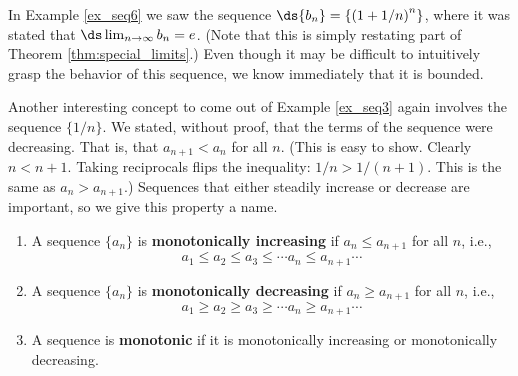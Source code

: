 
In Example \ref{ex_seq6} we saw the sequence $\ds \{b_n\} = \left\{\left(1+1/n\right)^{n}\right\}$, where it was stated that $\ds \lim_{n\to\infty} b_n = e$. (Note that this is simply restating part of Theorem \ref{thm:special_limits}.) Even though it may be difficult to intuitively grasp the behavior of this sequence, we know immediately that it is bounded.

Another interesting concept to come out of Example \ref{ex_seq3} again involves the sequence $\{1/n\}$. We stated, without proof, that the terms of the sequence were decreasing. That is, that $a_{n+1} < a_n$ for all $n$. (This is easy to show. Clearly $n < n+1$. Taking reciprocals flips the inequality: $1/n > 1/(n+1)$. This is the same as $a_n > a_{n+1}$.) Sequences that either steadily increase or decrease are important, so we give this property a name.

{\begin{enumerate}
\item		A sequence $\{a_n\}$ is \textbf{monotonically increasing} if $a_n \leq a_{n+1}$ for all $n$, i.e.,
 $$a_1 \leq a_2 \leq a_3 \leq \cdots a_n \leq a_{n+1} \cdots$$
 \item	A sequence $\{a_n\}$ is \textbf{monotonically decreasing} if $a_n \geq a_{n+1}$ for all $n$, i.e.,
 $$a_1 \geq a_2 \geq a_3 \geq \cdots a_n \geq a_{n+1} \cdots$$
 \item	A sequence is \textbf{monotonic} if it is monotonically increasing or monotonically decreasing.
 \end{enumerate}
}


